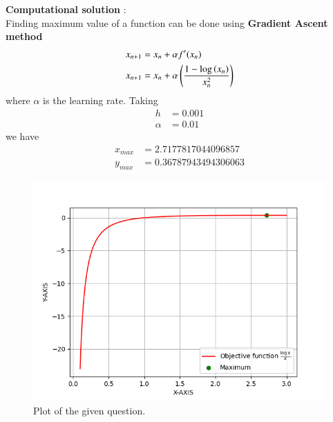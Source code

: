 \documentclass[journal]{IEEEtran}
\begin{document}
\textbf{Computational solution} : \\

Finding maximum value of a function can be done using \textbf{Gradient Ascent method} \\
\begin{align}
	x_{n+1} &= x_{n} + \alpha f^{\prime} (x_{n}) \\
	x_{n+1} &= x_{n} + \alpha \left(\frac{1 - \log \left(x_{n}\right)}{x_{n}^2}\right) \\
\end{align}
where $\alpha$ is the learning rate.
Taking
\begin{align}
	h &= 0.001 \\
	\alpha &= 0.01
\end{align}
we have
\begin{align}
	x_{max} &= 2.7177817044096857 \\
	y_{max} &= 0.36787943494306063
\end{align}

\begin{figure}[h]
\centering
\includegraphics[width=\columnwidth]{figs/fig.png}
\caption{Plot of the given question.}
\label{fig:Plot1} 
\end{figure}
\end{document}
